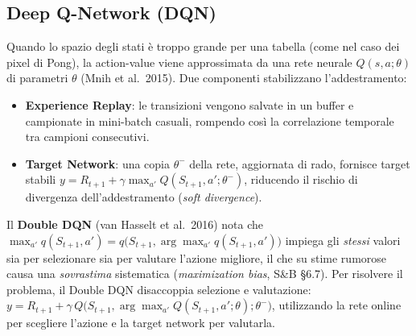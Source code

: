 \subsection{Deep Q-Network (DQN)}
Quando lo spazio degli stati \`e troppo grande per una tabella (come nel caso dei pixel
di Pong), la action-value viene approssimata da una rete neurale
$Q(s,a;\theta)$ di parametri $\theta$ (Mnih et al.\ 2015). Due componenti
stabilizzano l'addestramento:
\begin{itemize}[nosep]
  \item \textbf{Experience Replay}: le transizioni vengono salvate in un buffer e
        campionate in mini-batch casuali, rompendo cos\`i la correlazione temporale tra
        campioni consecutivi.
  \item \textbf{Target Network}: una copia $\theta^-$ della rete, aggiornata di
        rado, fornisce target stabili
        $y = R_{t+1} + \gamma \max_{a'} Q(S_{t+1},a';\theta^-)$, riducendo il
        rischio di divergenza dell'addestramento (\emph{soft divergence}).
\end{itemize}

Il \textbf{Double DQN} (van Hasselt et al.\ 2016) nota che
$\max_{a'} q(S_{t+1},a') = q\big(S_{t+1}, \arg\max_{a'} q(S_{t+1},a')\big)$ impiega
gli \emph{stessi} valori sia per selezionare sia per valutare l'azione migliore, il che
su stime rumorose causa una \emph{sovrastima} sistematica (\emph{maximization bias},
S\&B \S6.7). Per risolvere il problema, il Double DQN disaccoppia selezione e
valutazione:
$y = R_{t+1} + \gamma\, Q\big(S_{t+1}, \arg\max_{a'}Q(S_{t+1},a';\theta);\theta^-\big)$,
utilizzando la rete online per scegliere l'azione e la target network per valutarla.
